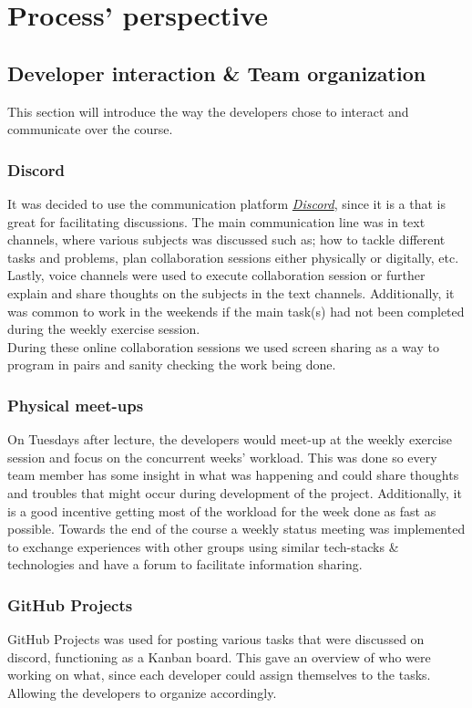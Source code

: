 \section{Process' perspective}
\subsection{Developer interaction \& Team organization}
This section will introduce the way the developers chose to interact and communicate over the course. 

\subsubsection{Discord}
It was decided to use the communication platform \href{https://discord.com/}{\textit{Discord}}, since it is a that is great for facilitating discussions. The main communication line was in text channels, where various subjects was discussed such as; how to tackle different tasks and problems, plan collaboration sessions either physically or digitally, etc. Lastly, voice channels were used to execute collaboration session or further explain and share thoughts on the subjects in the text channels. Additionally, it was common to work in the weekends if the main task(s) had not been completed during the weekly exercise session. \\
During these online collaboration sessions we used screen sharing as a way to program in pairs and sanity checking the work being done.

\subsubsection{Physical meet-ups}
On Tuesdays after lecture, the developers would meet-up at the weekly exercise session and focus on the concurrent weeks' workload. This was done so every team member has some insight in what was happening and could share thoughts and troubles that might occur during development of the project. Additionally, it is a good incentive getting most of the workload for the week done as fast as possible. Towards the end of the course a weekly status meeting was implemented to exchange experiences with other groups using similar tech-stacks \& technologies and have a forum to facilitate information sharing.

\subsubsection{GitHub Projects}
GitHub Projects was used for posting various tasks that were discussed on discord, functioning as a Kanban board. This gave an overview of who were working on what, since each developer could assign themselves to the tasks. Allowing the developers to organize accordingly.

